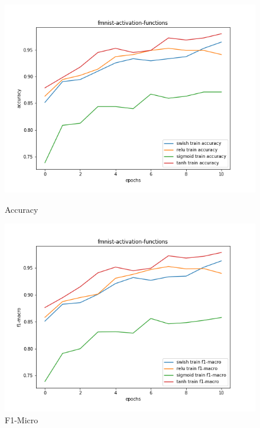 \documentclass{article}
\begin{document}
\begin{figure}[!htb]
	\includegraphics[width=\linewidth]{../output_plots/FMNIST/task-3/fmnist-activation-functions-Accuracy-accuracy.png}
	\caption{Accuracy}\label{fig:part_1_task_3_accuracy}
	\endminipage\hfill
	\includegraphics[width=\linewidth]{../output_plots/FMNIST/task-3/fmnist-activation-functions-F1-Macro-score-f1-macro.png}
	\caption{F1-Micro}\label{fig:part_1_task_3_f1-micro}
	\endminipage

\end{figure}
\end{document}
